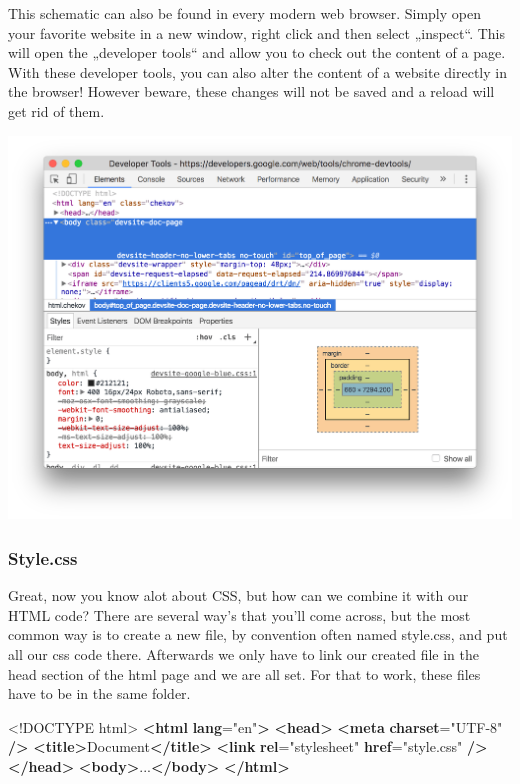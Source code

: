\documentclass[
]{article}
\newenvironment{Shaded}{\begin{snugshade}}{\end{snugshade}}
\newcommand{\DataTypeTok}[1]{\textcolor[rgb]{0.13,0.29,0.53}{#1}}
\newcommand{\ErrorTok}[1]{\textcolor[rgb]{0.64,0.00,0.00}{\textbf{#1}}}
\newcommand{\KeywordTok}[1]{\textcolor[rgb]{0.13,0.29,0.53}{\textbf{#1}}}
\newcommand{\NormalTok}[1]{#1}
\newcommand{\OtherTok}[1]{\textcolor[rgb]{0.56,0.35,0.01}{#1}}
\newcommand{\StringTok}[1]{\textcolor[rgb]{0.31,0.60,0.02}{#1}}
\begin{document}
This schematic can also be found in every modern web browser. Simply open your favorite website in a new window, right click and then select „inspect``. This will open the „developer tools`` and allow you to check out the content of a page. With these developer tools, you can also alter the content of a website directly in the browser! However beware, these changes will not be saved and a reload will get rid of them.

\includegraphics{docs/assets/ta-website.png}

\hypertarget{style.css}{%
\subsubsection*{Style.css}\label{style.css}}

Great, now you know alot about CSS, but how can we combine it with our HTML code? There are several way's that you'll come across, but the most common way is to create a new file, by convention often named style.css, and put all our css code there. Afterwards we only have to link our created file in the head section of the html page and we are all set. For that to work, these files have to be in the same folder.

\begin{Shaded}
\begin{Highlighting}[]
\DataTypeTok{\textless{}!DOCTYPE }\NormalTok{html}\DataTypeTok{\textgreater{}}
\KeywordTok{\textless{}html} \ErrorTok{lang}\OtherTok{=}\StringTok{"en"}\KeywordTok{\textgreater{}}
  \KeywordTok{\textless{}head\textgreater{}}
    \KeywordTok{\textless{}meta} \ErrorTok{charset}\OtherTok{=}\StringTok{"UTF{-}8"} \KeywordTok{/\textgreater{}}
    \KeywordTok{\textless{}title\textgreater{}}\NormalTok{Document}\KeywordTok{\textless{}/title\textgreater{}}
    \KeywordTok{\textless{}link} \ErrorTok{rel}\OtherTok{=}\StringTok{"stylesheet"} \ErrorTok{href}\OtherTok{=}\StringTok{"style.css"} \KeywordTok{/\textgreater{}}
  \KeywordTok{\textless{}/head\textgreater{}}
  \KeywordTok{\textless{}body\textgreater{}}\NormalTok{...}\KeywordTok{\textless{}/body\textgreater{}}
\KeywordTok{\textless{}/html\textgreater{}}
\end{Highlighting}
\end{Shaded}
\end{document}
